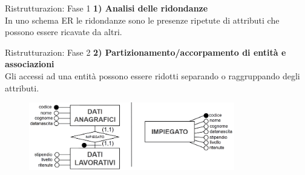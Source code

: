 \begin{frame}{Ristrutturazion: Fase 1}
\textbf{1) Analisi delle ridondanze}
\\\vspace{2em}
In uno schema ER le ridondanze sono le presenze ripetute di attributi che possono essere ricavate da altri.
\end{frame}
%
\begin{frame}{Ristrutturazion: Fase 2}
\textbf{2) Partizionamento/accorpamento di entit\`a e associazioni}
\\\vspace{2em}
Gli accessi ad una entit\`a possono essere ridotti separando o raggruppando degli attributi.
\begin{figure}[h]
        \centering
        \includegraphics[width=0.8\textwidth]{img/i5.png}
    \end{figure}
\end{frame}
